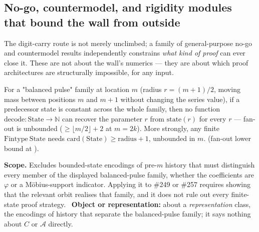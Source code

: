 \subsection{No-go, countermodel, and rigidity modules that bound the wall from outside}

The digit-carry route is not merely unclimbed; a family of general-purpose no-go and countermodel
results independently constrains \emph{what kind of proof} can ever close it. These are not about
the wall's numerics — they are about which proof architectures are structurally impossible, for any
input.

\begin{prop}
\label{prop:finite-state-nogo}
For a "balanced pulse" family at location $m$ (radius $r=(m{+}1)/2$, moving mass between positions
$m$ and $m{+}1$ without changing the series value), if a predecessor state is constant across the
whole family, then no function $\mathrm{decode}:\mathrm{State}\to\mathbb N$ can recover the
parameter $r$ from $\mathrm{state}(r)$ for every $r$ — fan-out is unbounded ($\ge\lfloor m/2\rfloor+2$
at $m=2k$). More strongly, any finite $\mathrm{Fintype}\ \mathrm{State}$ needs
$\mathrm{card}(\mathrm{State})\ge\mathrm{radius}+1$, unbounded in $m$.
(fan-out lower bound at
).

\textbf{Scope.} Excludes bounded-state encodings of pre-$m$ history that must distinguish every
member of the displayed balanced-pulse family, whether the coefficients are $\varphi$ or a
Möbius-support indicator. Applying it to \#249 or \#257 requires showing that the relevant orbit
realises that family, and it does not rule out every finite-state proof strategy.
\ \textbf{Object or representation:} about a \emph{representation}
class, the encodings of history that separate the balanced-pulse family; it says nothing about $C$
or $\mathcal A$ directly.
\end{prop}

